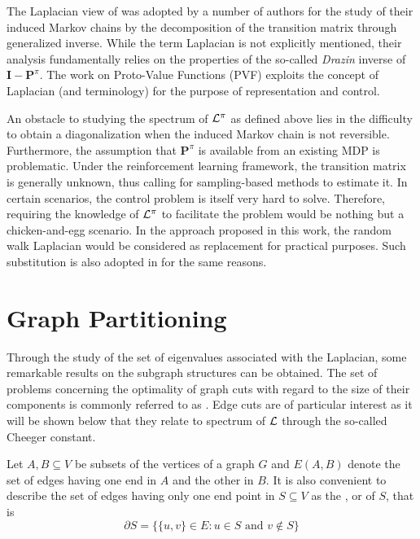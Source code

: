 The Laplacian view of \mdps was adopted by a number of authors \cite{Lamond1989,
Puterman1994, Filar2007} for the study of their induced Markov chains by the
decomposition of the transition matrix through generalized inverse. While the term 
Laplacian is not explicitly mentioned, their analysis fundamentally relies on the
properties of the so-called \textit{Drazin} inverse \cite{Drazin1958} of $\mathbf{I} -
\mathbf{P}^\pi$. The work on Proto-Value Functions (PVF) \cite{Mahadevan2009}
exploits the concept of Laplacian (and terminology) for the purpose of representation
and control.

An obstacle to studying the spectrum of $\mathbf{\mathcal{L}}^\pi$ as defined above lies in the
difficulty to obtain a diagonalization when the induced Markov chain is not
reversible. Furthermore, the assumption that $\mathbf{P}^\pi$ is available from an
existing MDP is problematic. Under the reinforcement learning framework, the transition
matrix is generally unknown, thus calling for sampling-based methods to estimate it. In
certain scenarios, the control problem is itself very hard to solve. Therefore, requiring
the knowledge of $\mathbf{\mathcal{L}}^\pi$ to facilitate the problem would be nothing but a
chicken-and-egg scenario. In the approach proposed in this work, the random walk
Laplacian would be considered as replacement for practical purposes. Such substitution
is also adopted in \cite{Mahadevan2009} for the same reasons.

\section{Graph Partitioning}
\label{sec:graph-partitioning}
Through the study of the set of eigenvalues associated with the Laplacian, some remarkable results on 	the subgraph structures can be obtained. The set of problems concerning the optimality of graph cuts with regard to the size of their components is commonly referred to as . Edge cuts are of particular interest as it will be shown below that they relate to spectrum of $\mathbf{\mathcal{L}}$ through the so-called Cheeger constant. 

Let $A, B \subseteq V$ be subsets of the vertices of a graph $G$ and $E(A, B)$ denote the set of edges having one end in $A$ and the other in $B$. It is also convenient to describe the set of edges having only one end point in $S \subseteq V$ as the  \cite{Chung1994}, \cite{Chung1997} or  \cite{Mohar91} of $S$, that is
\begin{equation}
\partial S = \{ \{u, v\} \in E : u \in S \text{ and } v \not \in S \}
\end{equation}

